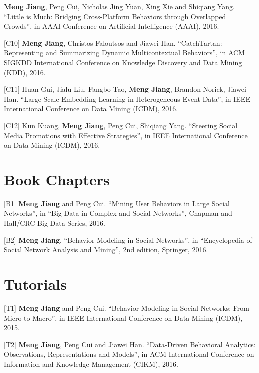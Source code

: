 \documentclass[margin, 10pt]{res}
\begin{document}
\begin{resume}
[C9] {\bf Meng Jiang}, Peng Cui, Nicholas Jing Yuan, Xing Xie and Shiqiang Yang. ``Little is Much: Bridging Cross-Platform Behaviors through Overlapped Crowds'', in AAAI Conference on Artificial Intelligence (AAAI), 2016.

[C10] {\bf Meng Jiang}, Christos Faloutsos and Jiawei Han. ``CatchTartan: Representing and Summarizing Dynamic Multicontextual Behaviors'', in ACM SIGKDD International Conference on Knowledge Discovery and Data Mining (KDD), 2016.

[C11] Huan Gui, Jialu Liu, Fangbo Tao, {\bf Meng Jiang}, Brandon Norick, Jiawei Han. ``Large-Scale Embedding Learning in Heterogeneous Event Data'', in IEEE International Conference on Data Mining (ICDM), 2016.

[C12] Kun Kuang, {\bf Meng Jiang}, Peng Cui, Shiqiang Yang. ``Steering Social Media Promotions with Effective Strategies'', in IEEE International Conference on Data Mining (ICDM), 2016.


\section{Book Chapters}

[B1] {\bf Meng Jiang} and Peng Cui. ``Mining User Behaviors in Large Social Networks'', in ``Big Data in Complex and Social Networks'', Chapman and Hall/CRC Big Data Series, 2016.

[B2] {\bf Meng Jiang}. ``Behavior Modeling in Social Networks'', in ``Encyclopedia of Social Network Analysis and Mining'', 2nd edition, Springer, 2016.


\section{Tutorials}

[T1] {\bf Meng Jiang} and Peng Cui. ``Behavior Modeling in Social Networks: From Micro to Macro'', in IEEE International Conference on Data Mining (ICDM), 2015.

[T2] {\bf Meng Jiang}, Peng Cui and Jiawei Han. ``Data-Driven Behavioral Analytics: Observations, Representations and Models'', in ACM International Conference on Information and Knowledge Management (CIKM), 2016.


\end{resume}
\end{document}
